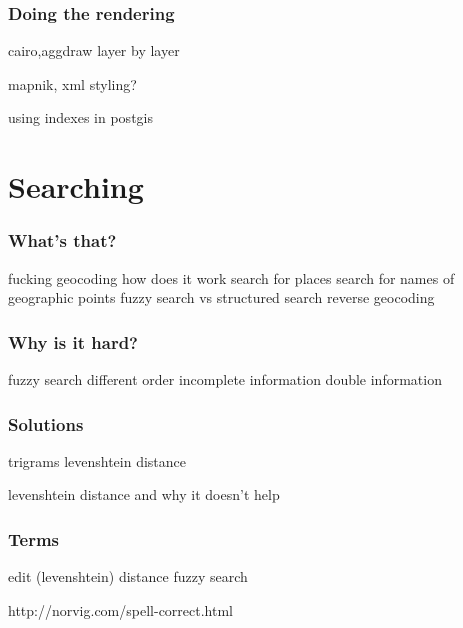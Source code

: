 \documentclass[14pt]{beamer}
\begin{document}

\begin{frame}
  \frametitle{Doing the rendering}
  cairo,aggdraw
  layer by layer
\end{frame}

\begin{frame}
  mapnik, xml styling?
\end{frame}

\begin{frame}
  using indexes in postgis
\end{frame}

\begin{frame}

\end{frame}

\section{Searching}

\begin{frame}
  \frametitle{What's that?}
  fucking geocoding how does it work
  search for places
  search for names of geographic points
  fuzzy search vs structured search
  reverse geocoding
\end{frame}

\begin{frame}
  \frametitle{Why is it hard?}
  fuzzy search
  different order
  incomplete information
  double information
\end{frame}

\begin{frame}
  \frametitle{Solutions}
  trigrams
  levenshtein distance
\end{frame}

\begin{frame}
  levenshtein distance and why it doesn't help
\end{frame}

\begin{frame}
  \frametitle{Terms}
  edit (levenshtein) distance
  fuzzy search
\end{frame}



http://norvig.com/spell-correct.html





\end{document}
